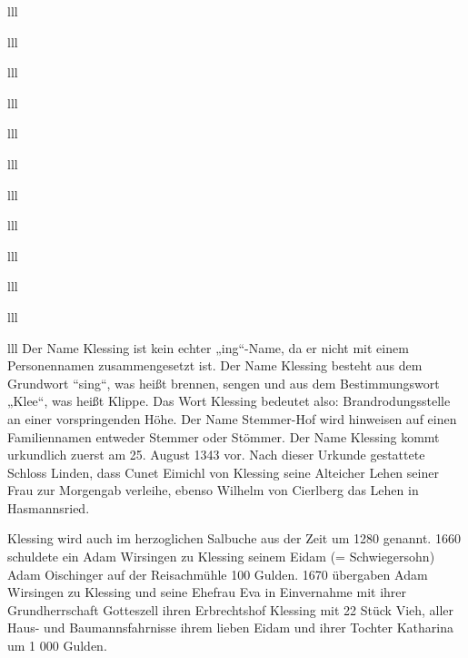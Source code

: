 \documentclass[12pt,a4pager]{book}
\begin{document}
\begin{tabuluar}{lll}
\begin{tabuluar}{lll}
\begin{tabuluar}{lll}
\begin{tabuluar}{lll}
\begin{tabuluar}{lll}
\begin{tabuluar}{lll}
\begin{tabuluar}{lll}
\begin{tabuluar}{lll}
\begin{tabuluar}{lll}
\begin{tabuluar}{lll}
\begin{tabuluar}{lll}
\begin{tabuluar}{lll}
Der Name Klessing ist kein echter „ing“-Name, da er nicht mit einem
Personennamen zusammengesetzt ist. Der Name Klessing besteht aus dem Grundwort
“sing“, was heißt brennen, sengen und aus dem Bestimmungswort „Klee“, was heißt
Klippe. Das Wort Klessing bedeutet also: Brandrodungsstelle an einer
vorspringenden Höhe. Der Name Stemmer-Hof wird hinweisen auf einen Familiennamen
entweder Stemmer oder Stömmer. Der Name Klessing kommt urkundlich zuerst am 25.
August 1343 vor. Nach dieser Urkunde gestattete Schloss Linden, dass Cunet
Eimichl von Klessing seine Alteicher Lehen seiner Frau zur Morgengab verleihe,
ebenso Wilhelm von Cierlberg das Lehen in Hasmannsried.

Klessing wird auch im herzoglichen Salbuche aus der Zeit um 1280 genannt. 1660
schuldete ein Adam Wirsingen zu Klessing seinem Eidam (= Schwiegersohn) Adam
Oischinger auf der Reisachmühle 100 Gulden. 1670 übergaben Adam Wirsingen zu
Klessing und seine Ehefrau Eva in Einvernahme mit ihrer Grundherrschaft
Gotteszell ihren Erbrechtshof Klessing mit 22 Stück Vieh, aller Haus- und
Baumannsfahrnisse ihrem lieben Eidam und ihrer Tochter Katharina um 1 000
Gulden.


\end{tabuluar}
\end{tabuluar}
\end{tabuluar}
\end{tabuluar}
\end{tabuluar}
\end{tabuluar}
\end{tabuluar}
\end{tabuluar}
\end{tabuluar}
\end{tabuluar}
\end{tabuluar}
\end{tabuluar}
\end{document}
